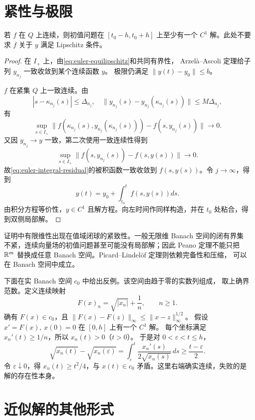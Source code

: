 \section{紧性与极限}

\begin{theorem}\label{thm:peano-existence}
若 \(f\) 在 \(Q\) 上连续，则初值问题在
\([t_0-h,t_0+h]\) 上至少有一个 \(C^1\) 解。此处不要求
\(f\) 关于 \(y\) 满足 Lipschitz 条件。
\end{theorem}
\begin{proof}
在 \(I_+\) 上，由\eqref{eq:euler-equilipschitz}和共同有界性，
Arzelà--Ascoli 定理给子列 \(y_{n_j}\) 一致收敛到某个连续函数 \(y\)。
极限仍满足 \(\|y(t)-y_0\|\le b\)。

\(f\) 在紧集 \(Q\) 上一致连续。由
\[
 |s-\kappa_{n_j}(s)|\le\Delta_{n_j},\quad
 \|y_{n_j}(s)-y_{n_j}(\kappa_{n_j}(s))\|\le M\Delta_{n_j},
\]
有
\[
 \sup_{s\in I_+}
 \|f(\kappa_{n_j}(s),y_{n_j}(\kappa_{n_j}(s)))
      -f(s,y_{n_j}(s))\|\longrightarrow0.
\]
又因 \(y_{n_j}\to y\) 一致，第二次使用一致连续性得到
\[
 \sup_{s\in I_+}\|f(s,y_{n_j}(s))-f(s,y(s))\|\to0.
\]
故\eqref{eq:euler-integral-residual}的被积函数一致收敛到
\(f(s,y(s))\)。令 \(j\to\infty\)，得到
\[
 y(t)=y_0+\int_{t_0}^{t}f(s,y(s))ds.
\]
由积分方程等价性，\(y\in C^1\) 且解方程。向左时间作同样构造，并在
\(t_0\) 处粘合，得到双侧局部解。
\end{proof}

证明中有限维性出现在值域闭球的紧致性。一般无限维 Banach 空间的闭有界集
不紧，连续向量场的初值问题甚至可能没有局部解；因此 Peano 定理不能只把
\(\mathbb{R}^m\) 替换成任意 Banach 空间。Picard--Lindelöf 定理则依赖完备性和压缩，
可以在 Banach 空间中成立。

下面在实 Banach 空间 \(c_0\) 中给出反例。该空间由趋于零的实数列组成，
取上确界范数。定义连续映射
\[
 F(x)_n=\sqrt{|x_n|}+\frac1n,\qquad n\ge1.
\]
确有 \(F(x)\in c_0\)，且
\(\|F(x)-F(z)\|_\infty\le\|x-z\|_\infty^{1/2}\)。
假设 \(x'=F(x),\ x(0)=0\) 在 \([0,h]\) 上有一个 \(C^1\) 解。
每个坐标满足 \(x_n'(t)\ge1/n\)，所以 \(x_n(t)>0\)（\(t>0\)）。
于是对 \(0<\varepsilon<t\le h\)，
\[
 \sqrt{x_n(t)}-\sqrt{x_n(\varepsilon)}
 =\int_\varepsilon^t\frac{x_n'(s)}{2\sqrt{x_n(s)}}\,ds
 \ge\frac{t-\varepsilon}{2}.
\]
令 \(\varepsilon\downarrow0\)，得 \(x_n(t)\ge t^2/4\)，与
\(x(t)\in c_0\) 矛盾。这里右端确实连续，失败的是解的存在性本身。

\section{近似解的其他形式}

